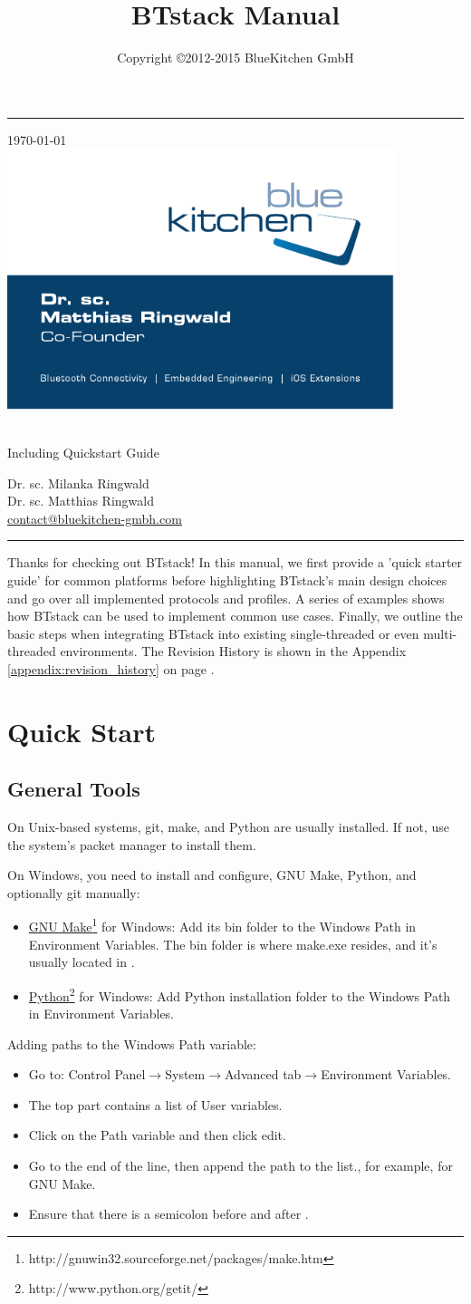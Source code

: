\documentclass[a4paper,titlepage,oneside,12pt]{amsart} %
\title[BTstack Manual] {BTstack Manual}
\author{Copyright \copyright 2012-2015 BlueKitchen GmbH}
\makeatletter
\newcommand{\versionNr}{1.3}
\newcommand{\authorMila}{Dr. sc. Milanka Ringwald}
\newcommand{\authorMatthias}{Dr. sc. Matthias Ringwald}
\newcommand{\bkContact}{\href{contact@bluekitchen-gmbh.com}{contact@bluekitchen-gmbh.com}}
\newcommand{\barWidth}{0.3cm}
\newcommand{\urlfoot}[2]{\href{#1}{{\color{blue} #2}}\footnote{#1}}
\renewcommand{\maketitle}{
  \begin{titlepage}
    \fosfamily
    \begin{center}
    \begin{minipage}[b]{\textwidth}
        \begin{minipage}[b]{.1\textwidth}
            \color{bkblue}\rule{\barWidth{}}{22cm}
        \end{minipage}
        \hfill\begin{minipage}[b]{.8\textwidth}\begin{flushright}
            {\color{bkblue}
            \today \\}
            \vspace*{7.5cm}
            \hfill\includegraphics[width=0.85\textwidth]{picts/bklogo.pdf}
            \vspace*{1.5cm}
            \begin{spacing}{2} 
                {\huge \color{bkblue} \@title} \\ 
                {\Large \color{bklightblue} Including Quickstart Guide}   
            \end{spacing} 
            \vspace*{1.5cm}
            {\color{bkblue}\large \authorMila \\
            \large \authorMatthias \\
            \large \bkContact\\ }
        \end{flushright}\end{minipage}
        \vfill
        \begin{minipage}[b]{\textwidth}
            \color{bklightblue}\rule{\barWidth{}}{\barWidth{}}
        \end{minipage}
    \end{minipage}

    
    \end{center}
  \end{titlepage}
}
\newcommand{\GNUMake}{\urlfoot{http://gnuwin32.sourceforge.net/packages/make.htm}{GNU Make}}
\newcommand{\Python}{\urlfoot{http://www.python.org/getit/}{Python}}
\makeatother
\begin{document}
\maketitle

\tableofcontents
\pagebreak


Thanks for checking out BTstack! In this manual, we first provide a 'quick starter guide' for common platforms before highlighting BTstack's main design choices and go over all implemented protocols and profiles. A series of examples shows how BTstack can be used to implement common 
use cases. Finally, we outline the basic steps when integrating BTstack into existing single-threaded or even multi-threaded environments. The Revision History is shown in the Appendix \ref{appendix:revision_history} on page \pageref{appendix:revision_history}.

\section{Quick Start}

\subsection{General Tools}
On Unix-based systems, git, make, and Python are usually installed. If not, use the system's packet manager to install them. 

On Windows, you need to install and configure, GNU Make, Python, and optionally git manually:
 \begin{itemize}
 \item \GNUMake{} for Windows: Add its bin folder to the Windows Path in Environment Variables. The bin folder is where make.exe resides, and it's usually located in . 
 \item \Python{} for Windows: Add Python installation folder to the Windows Path in Environment Variables.
 \end{itemize}

Adding paths to the Windows Path variable:
\begin{itemize} \label{sec:windowsPath}
   \item Go to: Control Panel$\rightarrow$System$\rightarrow$Advanced tab$\rightarrow$Environment Variables.
   \item The top part contains a list of User variables. 
   \item Click on the Path variable and then click edit.
   \item Go to the end of the line, then append the path to the list., for example,  for GNU Make.
   \item Ensure that there is a semicolon before and after . 
\end{itemize}
\end{document}
